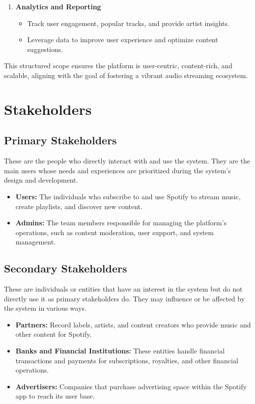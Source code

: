\documentclass[a4paper,10pt]{article}
\begin{document}
\begin{enumerate}[label=\arabic*.]
    \item \textbf{Analytics and Reporting}  
    \begin{itemize}
        \item Track user engagement, popular tracks, and provide artist insights.
        \item Leverage data to improve user experience and optimize content suggestions.
    \end{itemize}
\end{enumerate}

This structured scope ensures the platform is user-centric, content-rich, and scalable, aligning with the goal of fostering a vibrant audio streaming ecosystem.


\section{Stakeholders}
    \subsection{Primary Stakeholders}
    These are the people who directly interact with and use the system. They are the main users whose needs and experiences are prioritized during the system's design and development.

    \begin{itemize} 
        \item \textbf{Users:} The individuals who subscribe to and use Spotify to stream music, create playlists, and discover new content.
        \item \textbf{Admins:} The team members responsible for managing the platform’s operations, such as content moderation, user support, and system management.
    \end{itemize}

    \subsection{Secondary Stakeholders}
    These are individuals or entities that have an interest in the system but do not directly use it as primary stakeholders do. They may influence or be affected by the system in various ways.

    \begin{itemize}
        \item \textbf{Partners:} Record labels, artists, and content creators who provide music and other content for Spotify.
        \item \textbf{Banks and Financial Institutions:} These entities handle financial transactions and payments for subscriptions, royalties, and other financial operations.
        \item \textbf{Advertisers:} Companies that purchase advertising space within the Spotify app to reach its user base.
    \end{itemize}
\end{document}
